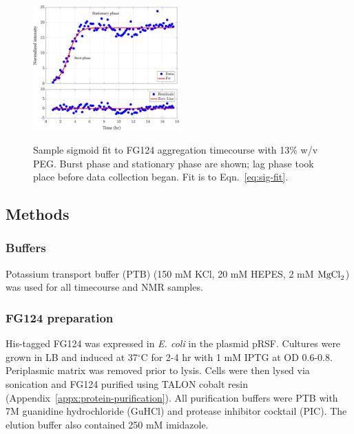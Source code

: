 \begin{figure}
\caption[Sample sigmoid fit to FG124 aggregation timecourse.]{Sample sigmoid fit to FG124 aggregation timecourse with 13\% w/v PEG.  Burst phase and stationary phase are shown; lag phase took place before data collection began.  Fit is to Eqn.~\ref{eq:sig-fit}.\\}
\centering
\includegraphics[width=0.5\textwidth]{figs/ch05/sample-sigmoid}
\label{fig:sigmoid-fit}
\end{figure}

\subsection{Methods}

\subsubsection{Buffers} Potassium transport buffer (PTB) (150 mM KCl, 20 mM HEPES, 2 mM $\mathrm{MgCl}_2$) was used for all timecourse and NMR samples.

\subsubsection{FG124 preparation} His-tagged FG124 was expressed in \textit{E. coli} in the plasmid pRSF.  Cultures were grown in LB and  induced at 37$^\circ$C for 2-4 hr with 1 mM IPTG at OD 0.6-0.8.  Periplasmic matrix was removed prior to lysis.  Cells were then lysed via sonication and FG124 purified using TALON cobalt resin (Appendix~\ref{appx:protein-purification}).  All purification buffers were PTB with 7M guanidine hydrochloride (GuHCl) and protease inhibitor cocktail (PIC).  The elution buffer also contained 250 mM imidazole.

